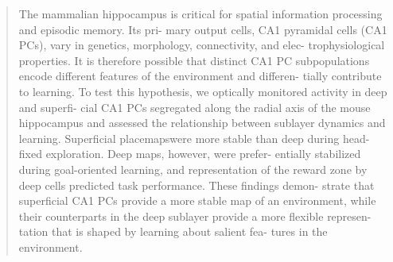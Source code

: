 \begin{quote}
The mammalian hippocampus is critical for spatial information processing and episodic memory. Its pri- mary output cells, CA1 pyramidal cells (CA1 PCs), vary in genetics, morphology, connectivity, and elec- trophysiological properties. It is therefore possible that distinct CA1 PC subpopulations encode different features of the environment and differen- tially contribute to learning. To test this hypothesis, we optically monitored activity in deep and superfi- cial CA1 PCs segregated along the radial axis of the mouse hippocampus and assessed the relationship between sublayer dynamics and learning. Superficial placemapswere more stable than deep during head- fixed exploration. Deep maps, however, were prefer- entially stabilized during goal-oriented learning, and representation of the reward zone by deep cells predicted task performance. These findings demon- strate that superficial CA1 PCs provide a more stable map of an environment, while their counterparts in the deep sublayer provide a more flexible represen- tation that is shaped by learning about salient fea- tures in the environment.
\end{quote}